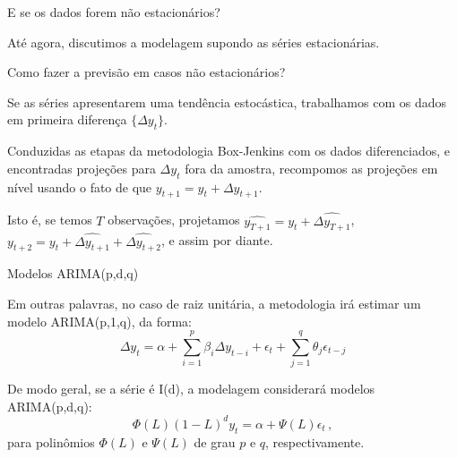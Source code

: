 \documentclass[11pt]{beamer}
\newenvironment{halfwideitemize}{\itemize\addtolength{\itemsep}{0.5em}}{\enditemize}
\begin{document}
\begin{frame}{E se os dados forem não estacionários?}
	\begin{halfwideitemize}
		\item Até agora, discutimos a modelagem supondo as séries estacionárias.
		\begin{halfwideitemize}
			\item Como fazer a previsão em casos não estacionários?
		\end{halfwideitemize}
		\item Se as séries apresentarem uma tendência estocástica, trabalhamos com os dados em primeira diferença $\{\Delta y_t\}$. 
		
		\item Conduzidas as etapas da metodologia Box-Jenkins com os dados diferenciados, e encontradas projeções para $\Delta y_t$ fora da amostra, recompomos as projeções  em nível usando o fato de que $y_{t+1} = y_t + \Delta y_{t+1}$.
		\begin{halfwideitemize}
			\item Isto é, se temos $T$ observações, projetamos $\widehat{y_{T+1}} = y_t + \widehat{{\Delta y_{T+1}}}$,  $y_{t+2} = y_t + \widehat{\Delta y_{t+1}} + \widehat{\Delta y_{t+2}}$, e assim por diante.
		\end{halfwideitemize}
		\end{halfwideitemize}
\end{frame}
\begin{frame}{Modelos ARIMA(p,d,q)}
	\begin{halfwideitemize}
				\item Em outras palavras, no caso de raiz unitária, a metodologia irá estimar um modelo {\color{blue}ARIMA(p,1,q)}, da forma:
		\begin{equation*}
			\Delta y_t =\alpha + \sum_{i=1}^p \beta_i \Delta y_{t-i} + \epsilon_t + \sum_{j=1}^q \theta_j \epsilon_{t-j}
		\end{equation*}
		\item De modo geral, se a série é I(d), a modelagem considerará modelos {\color{blue}ARIMA(p,d,q)}:
		$$\Phi(L)(1-L)^d y_t =  \alpha + \Psi(L)\epsilon_t \, ,$$
		para polinômios $\Phi(L)$ e $\Psi(L)$ de grau $p$ e $q$, respectivamente.

	\end{halfwideitemize}
\end{frame}
\end{document}
